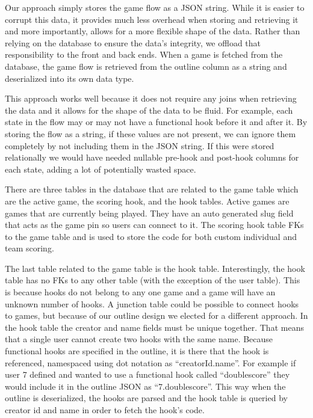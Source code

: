 \documentclass{article}
\begin{document}
    		Our approach simply stores the game flow as a JSON string. While it is easier to corrupt this data, it provides much less overhead when storing and retrieving it and more importantly, allows for a more flexible shape of the data. Rather than relying on the database to ensure the data's integrity, we offload that responsibility to the front and back ends. When a game is fetched from the database, the game flow is retrieved from the outline column as a string and deserialized into its own data type.
    		\smallskip
    		
    		This approach works well because it does not require any joins when retrieving the data and it allows for the shape of the data to be fluid. For example, each state in the flow may or may not have a functional hook before it and after it. By storing the flow as a string, if these values are not present, we can ignore them completely by not including them in the JSON string. If this were stored relationally we would have needed nullable pre-hook and post-hook columns for each state, adding a lot of potentially wasted space.
    		\smallskip
    		
    		There are three tables in the database that are related to the game table which are the active game, the scoring hook, and the hook tables. Active games are games that are currently being played. They have an auto generated slug field that acts as the game pin so users can connect to it. The scoring hook table FKs to the game table and is used to store the code for both custom individual and team scoring.
    		\smallskip
    		
    		The last table related to the game table is the hook table. Interestingly, the hook table has no FKs to any other table (with the exception of the user table). This is because hooks do not belong to any one game and a game will have an unknown number of hooks. A junction table could be possible to connect hooks to games, but because of our outline design we elected for a different approach. In the hook table the creator and name fields must be unique together. That means that a single user cannot create two hooks with the same name. Because functional hooks are specified in the outline, it is there that the hook is referenced, namespaced using dot notation as ``creatorId.name''. For example if user 7 defined and wanted to use a functional hook called ``doublescore'' they would include it in the outline JSON as ``7.doublescore''. This way when the outline is deserialized, the hooks are parsed and the hook table is queried by creator id and name in order to fetch the hook's code.
    		
\end{document}
